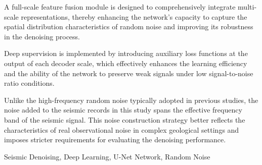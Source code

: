 \documentclass[preprint,12pt,authoryear]{elsarticle}
\begin{document}
\begin{frontmatter}
\begin{highlights}
    \item A full-scale feature fusion module is designed to comprehensively integrate multi-scale representations, thereby enhancing the network's capacity to capture the spatial distribution characteristics of random noise and improving its robustness in the denoising process.
    \item Deep supervision is implemented by introducing auxiliary loss functions at the output of each decoder scale, which effectively enhances the learning efficiency and the ability of the network to preserve weak signals under low signal-to-noise ratio conditions.
    \item Unlike the high-frequency random noise typically adopted in previous studies, the noise added to the seismic records in this study spans the effective frequency band of the seismic signal. This noise construction strategy better reflects the characteristics of real observational noise in complex geological settings and imposes stricter requirements for evaluating the denoising performance.
\end{highlights}


\begin{keyword}
Seismic Denoising, Deep Learning, U-Net Network, Random Noise
\end{keyword}

\end{frontmatter}



\end{document}
